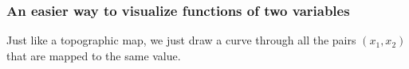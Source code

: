 \documentclass[xcolor=pdftex,dvipsnames]{beamer}
\begin{document}
\begin{frame}
\frametitle{An easier way to visualize functions of two variables}
Just like a topographic map, we just draw a curve through all the
pairs $(x_1,x_2)$ that are mapped to the same value.

\end{frame}
\end{document}
